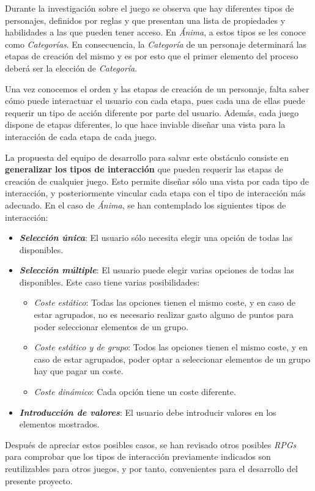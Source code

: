 Durante la investigación sobre el juego se observa que hay diferentes tipos de personajes, definidos por 
reglas y que presentan una lista de propiedades y habilidades a las que pueden tener acceso. En \textit{Ánima}, 
a estos tipos se les conoce como \textit{Categorías}. En consecuencia, la \textit{Categoría} de un personaje 
determinará las etapas de creación del mismo y es por esto que el primer elemento del proceso deberá ser 
la elección de \textit{Categoría}. \medskip

Una vez conocemos el orden y las etapas de creación de un personaje, falta saber cómo puede interactuar el usuario 
con cada etapa, pues cada una de ellas puede requerir un tipo de acción diferente por parte del usuario. Además, 
cada juego dispone de etapas diferentes, lo que hace inviable diseñar una vista para la interacción de cada etapa 
de cada juego. \medskip

La propuesta del equipo de desarrollo para salvar este obstáculo consiste en \textbf{generalizar los tipos de interacción} que pueden 
requerir las etapas de creación de cualquier juego. Esto permite diseñar sólo una vista por cada tipo de interacción, y posteriormente 
vincular cada etapa con el tipo de interacción más adecuado. En el caso de \textit{Ánima}, se han contemplado los siguientes 
tipos de interacción: 

\begin{itemize}
    \item \textit{\textbf{Selección única}}: El usuario sólo necesita elegir una opción de todas las disponibles.
    \item \textit{\textbf{Selección múltiple}}: El usuario puede elegir varias opciones de todas las disponibles. 
    Este caso tiene varias posibilidades:
    \begin{itemize}
        \item \textit{Coste estático}: Todas las opciones tienen el mismo coste, y en caso de estar agrupados, no es necesario 
        realizar gasto alguno de puntos para poder seleccionar elementos de un grupo.
        \item \textit{Coste estático y de grupo}: Todos las opciones tienen el mismo coste, y en caso de estar agrupados, poder 
        optar a seleccionar elementos de un grupo hay que pagar un coste.
        \item \textit{Coste dinámico}: Cada opción tiene un coste diferente.
    \end{itemize}
    \item \textit{\textbf{Introducción de valores}}: El usuario debe introducir valores en los elementos mostrados.
\end{itemize}\medskip

Después de apreciar estos posibles casos, se han revisado otros posibles \textit{RPGs} para comprobar que los tipos de 
interacción previamente indicados son reutilizables para otros juegos, y por tanto, convenientes para el desarrollo del 
presente proyecto. 


